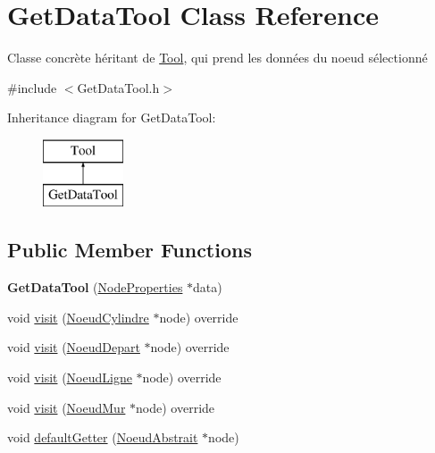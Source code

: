 \hypertarget{class_get_data_tool}{}\section{Get\+Data\+Tool Class Reference}
\label{class_get_data_tool}


Classe concrète héritant de \hyperlink{class_tool}{Tool}, qui prend les données du noeud sélectionné  




{\ttfamily \#include $<$Get\+Data\+Tool.\+h$>$}

Inheritance diagram for Get\+Data\+Tool\+:\begin{figure}[H]
\begin{center}
\leavevmode
\includegraphics[height=2.000000cm]{class_get_data_tool}
\end{center}
\end{figure}
\subsection*{Public Member Functions}
\begin{DoxyCompactItemize}
\item 
\hypertarget{class_get_data_tool_a9812d5218ecf28b18dbd8ae8180e98f6}{}{\bfseries Get\+Data\+Tool} (\hyperlink{struct_node_properties}{Node\+Properties} $\ast$data)\label{class_get_data_tool_a9812d5218ecf28b18dbd8ae8180e98f6}

\item 
void \hyperlink{group__inf2990_ga21292ea905abc9e5c85d04e4ca9b6863}{visit} (\hyperlink{class_noeud_cylindre}{Noeud\+Cylindre} $\ast$node) override
\item 
void \hyperlink{group__inf2990_ga4ce08dbc70076e50ec519cd082a9e1ad}{visit} (\hyperlink{class_noeud_depart}{Noeud\+Depart} $\ast$node) override
\item 
void \hyperlink{group__inf2990_gadac537c2e9d4cf9b5d27695f497f7b1d}{visit} (\hyperlink{class_noeud_ligne}{Noeud\+Ligne} $\ast$node) override
\item 
void \hyperlink{group__inf2990_ga9db0192f32035edd1e4b8c2858feb5d1}{visit} (\hyperlink{class_noeud_mur}{Noeud\+Mur} $\ast$node) override
\item 
void \hyperlink{group__inf2990_gab96d72787632de185fd46dee5d8b9750}{default\+Getter} (\hyperlink{class_noeud_abstrait}{Noeud\+Abstrait} $\ast$node)
\end{DoxyCompactItemize}


